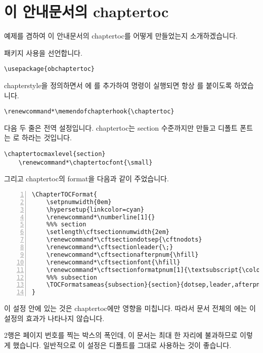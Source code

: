 \documentclass[chapter,a4paper,oneside,colorlinks]{oblivoir}
\renewcommand*\memendofchapterhook{\chaptertoc}
\renewcommand*\chaptertocfont{\small}
\renewcommand*\numberline[1]{}
\renewcommand*\cftsectiondotsep{\cftnodots}
\renewcommand*\cftsectionleader{\;}
\renewcommand*\cftsectionafterpnum{\hfill}
\renewcommand*\cftsectionfont{\hfill}
\renewcommand*\cftsectionformatpnum[1]{\textsubscript{\color{red}#1}}
\begin{document}
\section{이 안내문서의 chaptertoc}

예제를 겸하여 이 안내문서의 chaptertoc를 어떻게 만들었는지 소개하겠습니다.

패키지 사용을 선언합니다.
\begin{Verbatim}[baselinestretch=1.05]
   \usepackage{obchaptertoc}
\end{Verbatim}

chapterstyle을 정의하면서 \cmd{\memendofchapterhook}에 \cmd{\chaptertoc}를 추가하여 
\cmd{\chapter} 명령이 실행되면 항상 \cmd{\chaptertoc}를 붙이도록 하였습니다.
\begin{Verbatim}[baselinestretch=1.05]
	\renewcommand*\memendofchapterhook{\chaptertoc}
\end{Verbatim}

다음 두 줄은 전역 설정입니다. chaptertoc는 section 수준까지만 만들고 디폴트 폰트는 \cmd{\small}로
하라는 것입니다. 
\begin{Verbatim}[baselinestretch=1.05]
    \chaptertocmaxlevel{section}
    \renewcommand*\chaptertocfont{\small}
\end{Verbatim}

그리고 chaptertoc의 format을 다음과 같이 주었습니다.

\begin{Verbatim}[baselinestretch=1.05,numbers=left]
\ChapterTOCFormat{
    \setpnumwidth{0em}
    \hypersetup{linkcolor=cyan}
    \renewcommand*\numberline[1]{}
    %%% section
    \setlength\cftsectionnumwidth{2em}
    \renewcommand*\cftsectiondotsep{\cftnodots}
    \renewcommand*\cftsectionleader{\;}
    \renewcommand*\cftsectionafterpnum{\hfill}
    \renewcommand*\cftsectionfont{\hfill}
    \renewcommand*\cftsectionformatpnum[1]{\textsubscript{\color{red}#1}}
    %%% subsection
    \TOCFormatsameas{subsection}{section}{dotsep,leader,afterpnum,font,formatpnum,numwidth}
}
\end{Verbatim}

이 설정 안에 있는 것은 chaptertoc에만 영향을 미칩니다. 따라서 문서 전체의 \cmd{\tableofcontents}에는 
이 설정의 효과가 나타나지 않습니다.

2행은 페이지 번호를 찍는 박스의 폭인데, 이 문서는 최대 한 자리에 불과하므로 이렇게 했습니다. 일반적으로 이 설정은 디폴트를 그대로 사용하는 것이 좋습니다.
\end{document}
